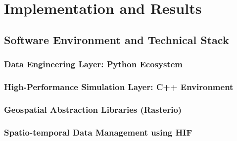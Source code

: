 \chapter{Implementation and Results}
\label{chapter:implementation_and_results}

\section{Software Environment and Technical Stack}

\subsection{Data Engineering Layer: Python Ecosystem}


\subsection{High-Performance Simulation Layer: C++ Environment}


\subsection{Geospatial Abstraction Libraries (Rasterio)}


\subsection{Spatio-temporal Data Management using HIF}

